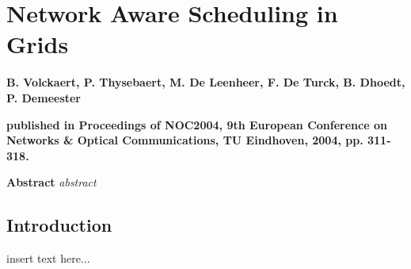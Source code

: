 \graphicspath{{chapt_dutch/}{intro/}{chapt2/}{chapt3/}{chapt4/}{chapt5/}}

\renewcommand\evenpagerightmark{{\scshape\small Appendix C}}
\renewcommand\oddpageleftmark{{\scshape\small Network Aware Scheduling in Grids}}

\renewcommand{\bibname}{References}

\hyphenation{}

\chapter[Network Aware Scheduling in Grids]%
{Network Aware Scheduling in Grids}
\label{app3}

\par{\large{\textbf{B. Volckaert, P. Thysebaert, M. De Leenheer, F. De Turck, B. Dhoedt, P. Demeester}}}
\vspace{0.2in}
\par{\noindent\textbf{published in Proceedings of NOC2004, 9th European Conference on Networks \& Optical Communications, TU Eindhoven, 2004, pp. 311-318.}}
\vspace{0.1in}

\par{\bf{Abstract}}
\emph{
abstract
}

\section{Introduction}
insert text here...




\clearpage{\pagestyle{empty}\cleardoublepage}
